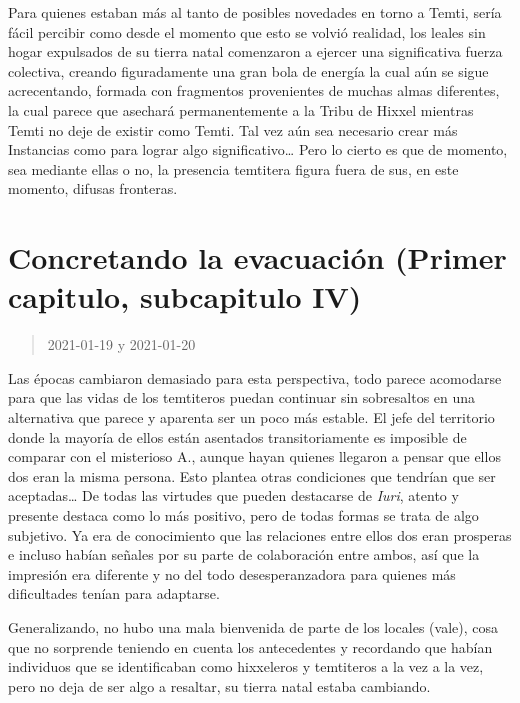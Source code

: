 \documentclass[
  spanish,
]{book}
\begin{document}
Para quienes estaban más al tanto de posibles novedades en torno a Temti, sería fácil percibir como desde el momento que esto se volvió realidad, los leales sin hogar expulsados de su tierra natal comenzaron a ejercer una significativa fuerza colectiva, creando figuradamente una gran bola de energía la cual aún se sigue acrecentando, formada con fragmentos provenientes de muchas almas diferentes, la cual parece que asechará permanentemente a la Tribu de Hixxel mientras Temti no deje de existir como Temti. Tal vez aún sea necesario crear más Instancias como para lograr algo significativo\ldots{} Pero lo cierto es que de momento, sea mediante ellas o no, la presencia temtitera figura fuera de sus, en este momento, difusas fronteras.

\hypertarget{concretando-la-evacuaciuxf3n-primer-capitulo-subcapitulo-iv}{%
\section{Concretando la evacuación (Primer capitulo, subcapitulo IV)}\label{concretando-la-evacuaciuxf3n-primer-capitulo-subcapitulo-iv}}

\begin{quote}
2021-01-19 y 2021-01-20
\end{quote}

Las épocas cambiaron demasiado para esta perspectiva, todo parece acomodarse para que las vidas de los temtiteros puedan continuar sin sobresaltos en una alternativa que parece y aparenta ser un poco más estable. El jefe del territorio donde la mayoría de ellos están asentados transitoriamente es imposible de comparar con el misterioso A., aunque hayan quienes llegaron a pensar que ellos dos eran la misma persona. Esto plantea otras condiciones que tendrían que ser aceptadas\ldots{}
De todas las virtudes que pueden destacarse de \emph{Iuri}, atento y presente destaca como lo más positivo, pero de todas formas se trata de algo subjetivo. Ya era de conocimiento que las relaciones entre ellos dos eran prosperas e incluso habían señales por su parte de colaboración entre ambos, así que la impresión era diferente y no del todo desesperanzadora para quienes más dificultades tenían para adaptarse.

Generalizando, no hubo una mala bienvenida de parte de los locales (vale), cosa que no sorprende teniendo en cuenta los antecedentes y recordando que habían individuos que se identificaban como hixxeleros y temtiteros a la vez a la vez, pero no deja de ser algo a resaltar, su tierra natal estaba cambiando.
\end{document}
